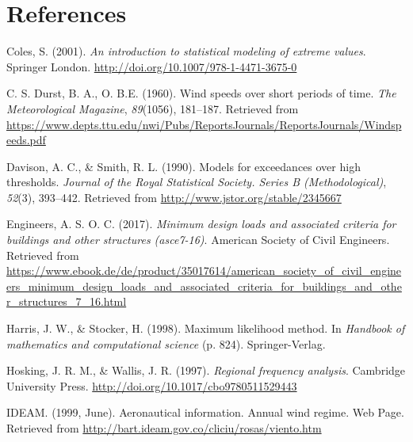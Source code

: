\documentclass[12pt,oneside]{reedthesis}
\begin{document}
\backmatter

\hypertarget{references}{%
\chapter*{References}\label{references}}


\noindent

\setlength{\parindent}{-0.20in}
\setlength{\leftskip}{0.20in}
\setlength{\parskip}{8pt}

\hypertarget{refs}{}
\leavevmode\hypertarget{ref-Coles2001}{}%
Coles, S. (2001). \emph{An introduction to statistical modeling of extreme values}. Springer London. \url{http://doi.org/10.1007/978-1-4471-3675-0}

\leavevmode\hypertarget{ref-Durst1960}{}%
C. S. Durst, B. A., O. B.E. (1960). Wind speeds over short periods of time. \emph{The Meteorological Magazine}, \emph{89}(1056), 181--187. Retrieved from \url{https://www.depts.ttu.edu/nwi/Pubs/ReportsJournals/ReportsJournals/Windspeeds.pdf}

\leavevmode\hypertarget{ref-Davison1990}{}%
Davison, A. C., \& Smith, R. L. (1990). Models for exceedances over high thresholds. \emph{Journal of the Royal Statistical Society. Series B (Methodological)}, \emph{52}(3), 393--442. Retrieved from \url{http://www.jstor.org/stable/2345667}

\leavevmode\hypertarget{ref-Asce2017}{}%
Engineers, A. S. O. C. (2017). \emph{Minimum design loads and associated criteria for buildings and other structures (asce7-16)}. American Society of Civil Engineers. Retrieved from \url{https://www.ebook.de/de/product/35017614/american_society_of_civil_engineers_minimum_design_loads_and_associated_criteria_for_buildings_and_other_structures_7_16.html}

\leavevmode\hypertarget{ref-Harris1994}{}%
Harris, J. W., \& Stocker, H. (1998). Maximum likelihood method. In \emph{Handbook of mathematics and computational science} (p. 824). Springer-Verlag.

\leavevmode\hypertarget{ref-Hosking1997}{}%
Hosking, J. R. M., \& Wallis, J. R. (1997). \emph{Regional frequency analysis}. Cambridge University Press. \url{http://doi.org/10.1017/cbo9780511529443}

\leavevmode\hypertarget{ref-ideam1999}{}%
IDEAM. (1999, June). Aeronautical information. Annual wind regime. Web Page. Retrieved from \url{http://bart.ideam.gov.co/cliciu/rosas/viento.htm}
\end{document}
